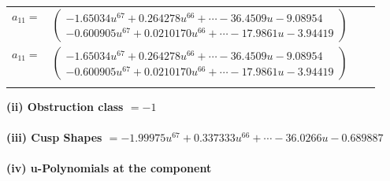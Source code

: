 \documentclass[1p]{elsarticle_modified}
\theoremstyle{definition}
\begin{document}
\begin{tabular}{m{7pt} m{180pt} m{7pt} m{180pt} }
\flushright $a_{11}=$&$\begin{pmatrix}-1.65034 u^{67}+0.264278 u^{66}+\cdots-36.4509 u-9.08954\\-0.600905 u^{67}+0.0210170 u^{66}+\cdots-17.9861 u-3.94419\end{pmatrix}$\\ \flushright $a_{11}=$&$\begin{pmatrix}-1.65034 u^{67}+0.264278 u^{66}+\cdots-36.4509 u-9.08954\\-0.600905 u^{67}+0.0210170 u^{66}+\cdots-17.9861 u-3.94419\end{pmatrix}$\\&\end{tabular}
\flushleft \textbf{(ii) Obstruction class $= -1$}\\~\\
\flushleft \textbf{(iii) Cusp Shapes $= -1.99975 u^{67}+0.337333 u^{66}+\cdots-36.0266 u-0.689887$}\\~\\
\newpage\renewcommand{\arraystretch}{1}
\flushleft \textbf{(iv) u-Polynomials at the component}\newline \\
\end{document}
